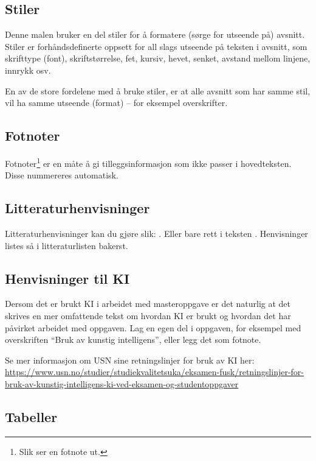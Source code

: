 \documentclass{USN-MSc}
\begin{document}
\subsection{Stiler}

Denne malen bruker en del stiler for å formatere (sørge for utseende på)
avsnitt. Stiler er forhåndsdefinerte oppsett for all slags utseende på teksten
i avsnitt, som skrifttype (font), skriftstørrelse, fet, kursiv, hevet, senket,
avstand mellom linjene, innrykk osv.

En av de store fordelene med å bruke stiler, er at alle avsnitt som har samme
stil, vil ha samme utseende (format) -- for eksempel overskrifter.

\subsection{Fotnoter}

Fotnoter\footnote{Slik ser en fotnote ut.} er en måte å gi tilleggsinformasjon
som ikke passer i hovedteksten. Disse nummereres automatisk.

\subsection{Litteraturhenvisninger}

Litteraturhenvisninger kan du gjøre slik: \parencite{seip1993}. Eller bare rett
i teksten \parencite{bombadil1999}. Henvisninger listes så i litteraturlisten
bakerst.

\subsection{Henvisninger til KI}

Dersom det er brukt KI i arbeidet med masteroppgave er det naturlig at det
skrives en mer omfattende tekst om hvordan KI er brukt og hvordan det har
påvirket arbeidet med oppgaven. Lag en egen del i oppgaven, for eksempel med
overskriften ``Bruk av kunstig intelligens'', eller legg det som fotnote.

Se mer informasjon om USN sine retningslinjer for bruk av KI her:
\url{https://www.usn.no/studier/studiekvalitetsuka/eksamen-fusk/retningslinjer-for-bruk-av-kunstig-intelligens-ki-ved-eksamen-og-studentoppgaver}

\subsection{Tabeller}
\end{document}

